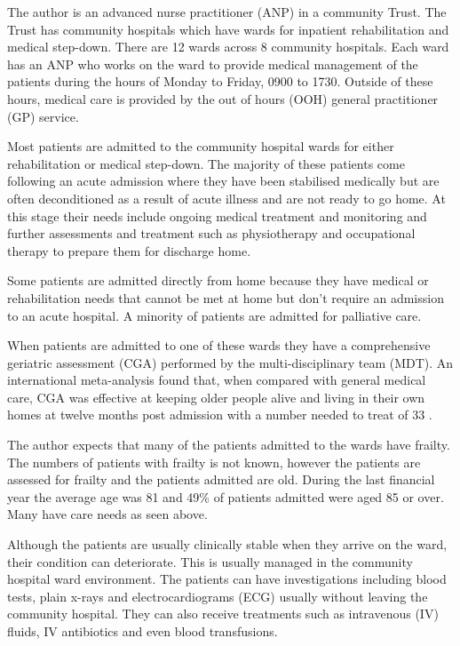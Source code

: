 \documentclass
[
	12pt,
	a4paper,
	oneside,
]{article}
\begin{document}
The author is an advanced nurse practitioner (ANP) in a community Trust.
The Trust has community hospitals which have wards for inpatient rehabilitation and
medical step-down. There are 12 wards across 8 community hospitals. Each ward has
an ANP who works on the ward to provide medical management of the patients during 
the hours of Monday to Friday, 0900 to 1730. Outside of these hours, medical care 
is provided by the out of hours (OOH) general practitioner (GP) service. 

Most patients are admitted to the community hospital wards for either rehabilitation
or medical step-down. The majority of these patients come following an acute admission
where they have been stabilised medically but are often deconditioned as a result
of acute illness and are not ready to go home. At this stage their needs include 
ongoing medical treatment and monitoring and further assessments and treatment such 
as physiotherapy and occupational therapy to prepare them for discharge home.

Some patients are admitted directly from home because they have medical or rehabilitation
needs that cannot be met at home but don't require an admission to an acute hospital.
A minority of patients are admitted for palliative care.

When patients are admitted to one of these wards they have a comprehensive geriatric 
assessment (CGA) \parencite{bgs:14} performed by the multi-disciplinary team (MDT).
An international meta-analysis found that, when compared with general medical care,
CGA was effective at keeping older people alive and living in their own homes at
twelve months post admission with a number needed to treat of 33 \parencite{ellis:11}.

The author expects that many of the patients admitted to the wards have frailty.
The numbers of patients with frailty is not known, however the patients are assessed 
for frailty and the patients admitted are old. During the last financial year the
average age was 81 and 49\% of patients admitted were aged 85 or over. Many have 
care needs as seen above.

Although the patients are usually clinically stable when they arrive on the ward,
their condition can deteriorate. This is usually managed in the community hospital
ward environment. The patients can have investigations including blood tests, plain
x-rays and electrocardiograms (ECG) usually without leaving the community hospital.
They can also receive treatments such as intravenous (IV) fluids, IV antibiotics
and even blood transfusions. 
\end{document}

